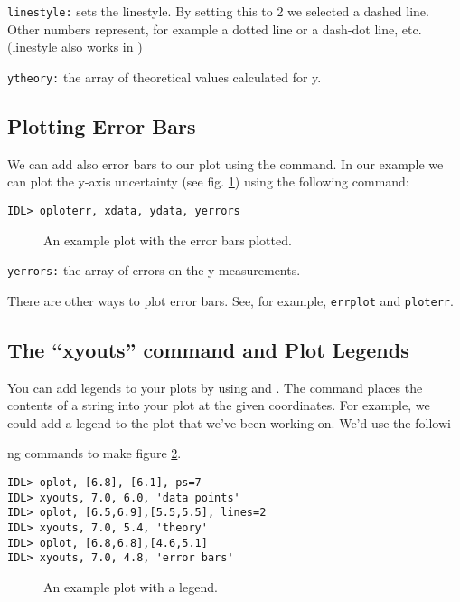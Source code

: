 \verb&linestyle:& sets the linestyle.  By setting this to 2 we selected
a dashed line.  Other numbers represent, for example a dotted line or a
dash-dot line, etc.  (linestyle also works in \plot)

\verb&ytheory:& the array of theoretical values calculated for y. 

\subsection{Plotting Error Bars}\label{ploterr}

	We can add also error bars to our plot using the \oploterr
command.  In our example we can plot the y-axis uncertainty (see fig. 
\ref{ex3}) using the following command:

\begin{verbatim}
IDL> oploterr, xdata, ydata, yerrors
\end{verbatim}

\begin{figure}[!ht]
\begin{center}
\leavevmode
{}
\end{center}
\caption{An example plot with the error bars plotted.}\label{ex3}
\end{figure}

\verb&yerrors:& the array of errors on the y measurements.

	There are other ways to plot error bars.  See, for example, \verb&errplot& and \verb&ploterr&.

\subsection{The ``xyouts'' command and Plot Legends}

	You can add legends to your plots by using \oplot and \xyouts.  The \xyouts command places the contents of a string into your plot at the given coordinates.  For example, we could add a legend to the plot that we've been working on.  We'd use the followi

ng commands to make figure \ref{ex4}.

\begin{verbatim}
IDL> oplot, [6.8], [6.1], ps=7
IDL> xyouts, 7.0, 6.0, 'data points'
IDL> oplot, [6.5,6.9],[5.5,5.5], lines=2
IDL> xyouts, 7.0, 5.4, 'theory'
IDL> oplot, [6.8,6.8],[4.6,5.1]
IDL> xyouts, 7.0, 4.8, 'error bars'
\end{verbatim}

\begin{figure}[!ht]
\begin{center}
\leavevmode
{}
\end{center}
\caption{An example plot with a legend.}\label{ex4}
\end{figure}

